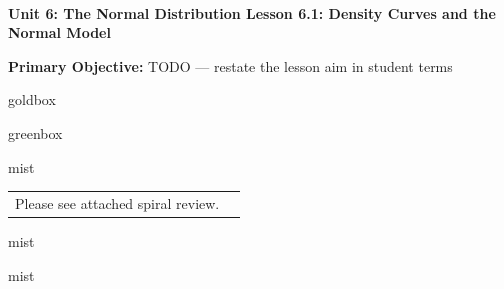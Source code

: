 \documentclass[10pt]{article}
\newcommand{\UnitNumberName}{Unit 6: The Normal Distribution \quad}
\newcommand{\LessonNumberName}{Lesson 6.1: Density Curves and the Normal Model}
\begin{document}
\begin{center}
    {\Large\bfseries \CourseName \\
    {\small\bfseries \UnitNumberName \LessonNumberName}}
\end{center}

\begin{tcolorbox}[colback=mist, colframe=royal, boxrule=0.9pt, arc=2mm,
    left=2mm, right=2mm, top=1.5mm, bottom=1.5mm]
    \textbf{Primary Objective:} TODO --- restate the lesson aim in student terms
\end{tcolorbox}

\renewcommand{\arraystretch}{1.6}
\begin{skillbox}{goldbox}
\end{skillbox}

\begin{skillbox}{greenbox}
\end{skillbox}

\begin{fixedskillbox}{mist}
    \begin{tabularx}{\linewidth}{@{}X c@{}}
        \begin{minipage}[t]{0.55\linewidth}\vspace{0pt}
            Please see attached spiral review.  %
        \end{minipage}
        &
        \begin{minipage}[t]{0.38\linewidth}\vspace{0pt}\centering
        \end{minipage}
    \end{tabularx}
\end{fixedskillbox}

\begin{skillbox}[Hook]{mist}
\end{skillbox}

\begin{skillbox}[Lesson]{mist}
\end{skillbox}
\end{document}
